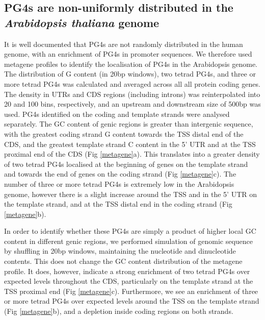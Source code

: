\documentclass[12pt,a4paper,]{report}
\begin{document}
\newpage

\hypertarget{pg4s-are-non-uniformly-distributed-in-the-arabidopsis-thaliana-genome}{%
\subsection{\texorpdfstring{PG4s are non-uniformly distributed in the
\emph{Arabidopsis thaliana}
genome}{PG4s are non-uniformly distributed in the Arabidopsis thaliana genome}}\label{pg4s-are-non-uniformly-distributed-in-the-arabidopsis-thaliana-genome}}

It is well documented that PG4s are not randomly distributed in the
human genome, with an enrichment of PG4s in promoter sequences. We
therefore used metagene profiles to identify the localisation of PG4s in
the Arabidopsis genome. The distribution of G content (in 20bp windows),
two tetrad PG4s, and three or more tetrad PG4s was calculated and
averaged across all all protein coding genes. The density in UTRs and
CDS regions (including introns) was reinterpolated into 20 and 100 bins,
respectively, and an upstream and downstream size of 500bp was used.
PG4s identified on the coding and template strands were analysed
separately. The GC content of genic regions is greater than intergenic
sequence, with the greatest coding strand G content towards the TSS
distal end of the CDS, and the greatest template strand C content in the
5' UTR and at the TSS proximal end of the CDS (Fig \ref{metagene}a).
This translates into a greater density of two tetrad PG4s localised at
the beginning of genes on the template strand and towards the end of
genes on the coding strand (Fig \ref{metagene}c). The number of three or
more tetrad PG4s is extremely low in the Arabidopsis genome, however
there is a slight increase around the TSS and in the 5' UTR on the
template strand, and at the TSS distal end in the coding strand (Fig
\ref{metagene}b).

In order to identify whether these PG4s are simply a product of higher
local GC content in different genic regions, we performed simulation of
genomic sequence by shuffling in 20bp windows, maintaining the
nucleotide and dinucleotide contents. This does not change the GC
content distribution of the metagene profile. It does, however, indicate
a strong enrichment of two tetrad PG4s over expected levels throughout
the CDS, particularly on the template strand at the TSS proximal end
(Fig \ref{metagene}c). Furthermore, we see an enrichment of three or
more tetrad PG4s over expected levels around the TSS on the template
strand (Fig \ref{metagene}b), and a depletion inside coding regions on
both strands.
\end{document}
